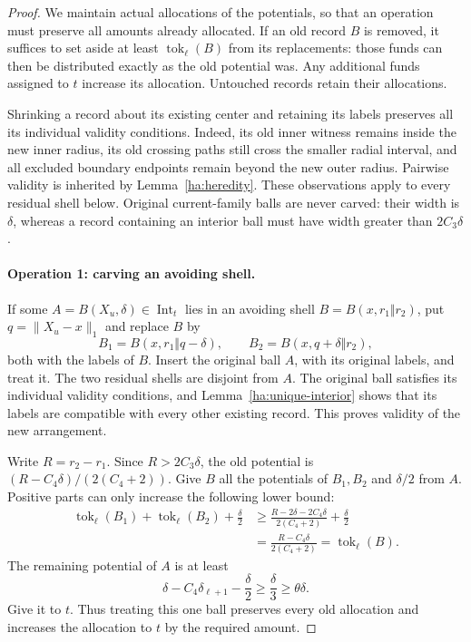 \begin{proof}
We maintain actual allocations of the potentials, so that an operation
must preserve all amounts already allocated.  If an old record $B$ is
removed, it suffices to set aside at least
$\operatorname{tok}_\ell(B)$ from its replacements: those funds can
then be distributed exactly as the old potential was.  Any additional
funds assigned to $t$ increase its allocation.  Untouched records retain
their allocations.

Shrinking a record about its existing center and retaining its labels
preserves all its individual validity conditions.  Indeed, its old
inner witness remains inside the new inner radius, its old crossing
paths still cross the smaller radial interval, and all excluded
boundary endpoints remain beyond the new outer radius.  Pairwise
validity is inherited by Lemma~\ref{ha:heredity}.  These observations
apply to every residual shell below.  Original current-family balls
are never carved: their width is $\delta$, whereas a record containing
an interior ball must have width greater than $2C_3\delta$.

\paragraph{\textbf{Operation 1: carving an avoiding shell.}}
If some $A=B(X_u,\delta)\in\operatorname{Int}_t$ lies in an avoiding
shell $B=B(x,r_1\Vert r_2)$, put $q=\|X_u-x\|_1$ and replace $B$ by
\[
 B_1=B(x,r_1\Vert q-\delta),\qquad
 B_2=B(x,q+\delta\Vert r_2),
\]
both with the labels of $B$.  Insert the original ball $A$, with its
original labels, and treat it.  The two residual shells are disjoint
from $A$.  The original ball satisfies its individual validity
conditions, and Lemma~\ref{ha:unique-interior} shows that its labels
are compatible with every other existing record.  This proves validity
of the new arrangement.

Write $R=r_2-r_1$.  Since $R>2C_3\delta$, the old potential is
$(R-C_4\delta)/(2(C_4+2))$.  Give $B$ all the potentials of $B_1,B_2$ and
$\delta/2$ from $A$.  Positive parts can only increase the following
lower bound:
\begin{align*}
 \operatorname{tok}_\ell(B_1)+\operatorname{tok}_\ell(B_2)
       +\frac\delta2
 &\geq\frac{R-2\delta-2C_4\delta}{2(C_4+2)}
       +\frac\delta2\\
 &=\frac{R-C_4\delta}{2(C_4+2)}
  =\operatorname{tok}_\ell(B).
\end{align*}
The remaining potential of $A$ is at least
\[
 \delta-C_4\delta_{\ell+1}-\frac\delta2
 \geq\frac\delta3\geq\theta\delta.
\]
Give it to $t$.  Thus treating this one ball preserves every old
allocation and increases the allocation to $t$ by the required amount.


\end{proof}
